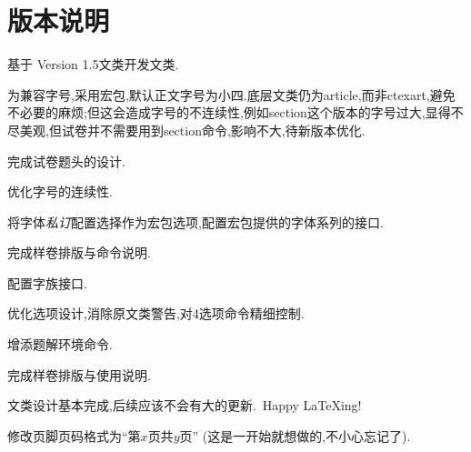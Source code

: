 \documentclass[list,answers,csize4,custom]{sysuexam}
\begin{document}
\section{版本说明}
\small{
\par
\begin{compactitem}
    \item 基于\href{https://github.com/mathedu4all/bhcexam}{} Version 1.5文类开发文类.
    \item 为兼容字号,采用\CTeX{}宏包,默认正文字号为小四.底层文类仍为article,而非ctexart,避免不必要的麻烦;但这会造成字号的不连续性,例如section这个版本的字号过大,显得不尽美观,但试卷并不需要用到section命令,影响不大,待新版本优化.
    \item 完成试卷题头的设计.
\end{compactitem}

\todo\par
\begin{compactitem}
    \item 优化字号的连续性.
    \item 将字体\textit{私订}配置选择作为宏包选项,配置\CTeX{}宏包提供的字体系列的接口.
    \item 完成样卷排版与命令说明.
\end{compactitem}

\par
\begin{compactitem}
    \item 配置字族接口.
    \item 优化选项设计,消除原文类警告,对4选项命令精细控制.
    \item 增添题解环境命令.
    \item 完成样卷排版与使用说明.
\end{compactitem}
\medskip

文类设计基本完成,后续应该不会有大的更新.~Happy \LaTeX{}ing!

\par
\begin{compactitem}
    \item 修改页脚页码格式为``第$x$页\quad 共$y$页'' (这是一开始就想做的,不小心忘记了).
\end{compactitem}


}
\end{document}
